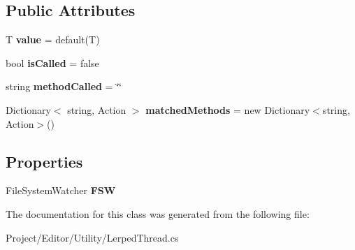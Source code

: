 \subsection*{Public Attributes}
\begin{DoxyCompactItemize}
\item 
\mbox{\label{class_lerp2_a_p_i_editor_1_1_utility_1_1_lerped_thread_a65717e0bcfeb29e6ef7e8329e658d61a}} 
T {\bfseries value} = default(T)
\item 
\mbox{\label{class_lerp2_a_p_i_editor_1_1_utility_1_1_lerped_thread_a50fa4a6ab93d0e833943f446d5e22bb2}} 
bool {\bfseries is\+Called} = false
\item 
\mbox{\label{class_lerp2_a_p_i_editor_1_1_utility_1_1_lerped_thread_a9d52b6fa07d8175811ba4df8eb9858ad}} 
string {\bfseries method\+Called} = \char`\"{}\char`\"{}
\item 
\mbox{\label{class_lerp2_a_p_i_editor_1_1_utility_1_1_lerped_thread_a98622930c790858b78f8a7b3f6e47da1}} 
Dictionary$<$ string, Action $>$ {\bfseries matched\+Methods} = new Dictionary$<$string, Action$>$()
\end{DoxyCompactItemize}
\subsection*{Properties}
\begin{DoxyCompactItemize}
\item 
\mbox{\label{class_lerp2_a_p_i_editor_1_1_utility_1_1_lerped_thread_a65c8afd672d7f9fcc79b6c212d1fc590}} 
File\+System\+Watcher {\bfseries F\+SW}
\end{DoxyCompactItemize}


The documentation for this class was generated from the following file\+:\begin{DoxyCompactItemize}
\item 
Project/\+Editor/\+Utility/Lerped\+Thread.\+cs\end{DoxyCompactItemize}
